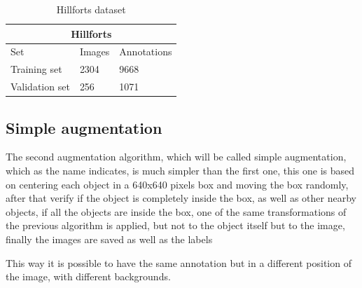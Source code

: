 \begin{table}[H]
\centering
\begin{tabular}{|p{3cm}|p{2.5cm}|p{2cm}|} 
\hline
\multicolumn{3}{|c|}{Hillforts} \\
 \hline
  Set & Images & Annotations\\ [0.5ex] 
 \hline
 Training set & 2304 & 9668 \\ 
 Validation set & 256 & 1071  \\[1ex]
 \hline
\end{tabular}
\caption{Hillforts dataset}
\end{table} 


\subsection{Simple augmentation}
The second augmentation algorithm, which will be called simple augmentation, which as the name indicates, is much simpler than the first one, this one is based on centering each object in a 640x640 pixels box and moving the box randomly, after that verify if the object is completely inside the box, as well as other nearby objects, if all the objects are inside the box, one of the same transformations of the previous algorithm is applied, but not to the object itself but to the image, finally the images are saved as well as the labels

This way it is possible to have the same annotation but in a different position of the image, with different backgrounds.

%
%
%
%
%
%
%
